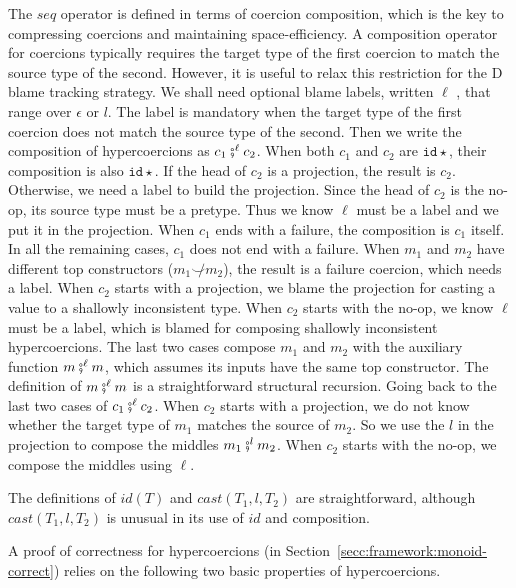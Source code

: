 \documentclass[acmsmall,review,anonymous]{acmart}\settopmatter{printfolios=true,printccs=false,printacmref=false}
\newcommand{\hyperCoercionI}[0]{\mathtt{id\star}}
\begin{document}
The $seq$ operator is defined in terms of coercion composition, which
is the key to compressing coercions and maintaining space-efficiency.
A composition operator for coercions typically requires the target
type of the first coercion to match the source type of the second.
However, it is useful to relax this restriction for the D blame
tracking strategy.
%
We shall need optional blame labels, written $\ell$ , that range over
$\epsilon$ or $l$. The label is mandatory when the target
type of the first coercion does not match the source type of the second. 
Then we write the composition of hypercoercions as $c_1
\fatsemi^\ell c_2$.  When both $c_1$ and $c_2$ are $\hyperCoercionI$,
their composition is also $\hyperCoercionI$.  If the head of $c_2$ is
a projection, the result is $c_2$.  Otherwise, we need a label to
build the projection. Since the head of $c_2$ is the no-op, its
source type must be a pretype. Thus we know $\ell$ must be a label and
we put it in the projection. When $c_1$ ends with a failure, the
composition is $c_1$ itself. In all the remaining cases, $c_1$ does
not end with a failure.  When $m_1$ and $m_2$ have different top
constructors ($m_1 \not\smile m_2$), the result is a failure coercion,
which needs a label. When $c_2$ starts with a projection, we blame the 
projection for casting a value to a shallowly inconsistent type. When $c_2$
starts with the no-op, we know $\ell$ must be a label, which is blamed for
composing shallowly inconsistent hypercoercions. The last two cases
compose $m_1$ and $m_2$ with the auxiliary function $m \fatsemi^\ell
m$, which assumes its inputs have the same top constructor. The
definition of $m \fatsemi^\ell m$ is a straightforward structural
recursion. Going back to the last two cases of $c_1 \fatsemi^\ell
c_2$. When $c_2$ starts with a projection, we do not know whether the
target type of $m_1$ matches the source of $m_2$. So we use the $l$ in the 
projection to  compose the middles $m_1 \fatsemi^l m_2$. When $c_2$ starts with 
the no-op, we compose the middles using $\ell$.

The definitions of $id(T)$ and $cast(T_1,l,T_2)$ are straightforward,
although $cast(T_1,l,T_2)$ is unusual in its use of $id$ and
composition.

A proof of correctness for hypercoercions (in 
Section~\ref{secc:framework:monoid-correct}) relies on the following
two basic properties of hypercoercions.
\end{document}
